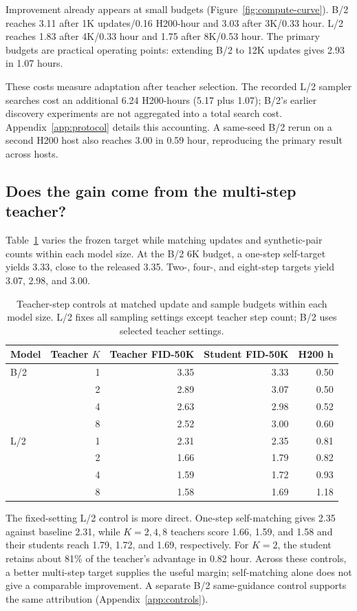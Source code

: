 \documentclass{article}
\begin{document}
Improvement already appears at small budgets (Figure~\ref{fig:compute-curve}).
B/2 reaches 3.11 after 1K updates/0.16 H200-hour and 3.03 after
3K/0.33 hour. L/2 reaches 1.83 after 4K/0.33 hour and 1.75 after
8K/0.53 hour. The primary budgets are practical operating points:
extending B/2 to 12K updates gives 2.93 in 1.07 hours.

These costs measure adaptation after teacher selection. The recorded L/2
sampler searches cost an additional 6.24 H200-hours (5.17 plus 1.07);
B/2's earlier discovery experiments are not aggregated into a total
search cost. Appendix~\ref{app:protocol} details this accounting.
A same-seed B/2 rerun on a second H200 host also reaches 3.00 in
0.59 hour, reproducing the primary result across hosts.

\subsection{Does the gain come from the multi-step teacher?}
Table~\ref{tab:compute-teacher} varies the frozen target while matching
updates and synthetic-pair counts within each model size. At the B/2 6K
budget, a one-step self-target yields 3.33, close to the released 3.35.
Two-, four-, and eight-step targets yield 3.07, 2.98, and 3.00.

\begin{table}[t]
\centering
\caption{Teacher-step controls at matched update and sample budgets within
each model size. L/2 fixes all sampling settings except teacher step count;
B/2 uses selected teacher settings.}
\begin{tabular}{lrrrr}
\toprule
Model & Teacher $K$ & Teacher FID-50K & Student FID-50K & H200 h \\
\midrule
B/2 & 1 & 3.35 & 3.33 & 0.50 \\
& 2 & 2.89 & 3.07 & 0.50 \\
& 4 & 2.63 & 2.98 & 0.52 \\
& 8 & 2.52 & 3.00 & 0.60 \\
\midrule
L/2 & 1 & 2.31 & 2.35 & 0.81 \\
& 2 & 1.66 & 1.79 & 0.82 \\
& 4 & 1.59 & 1.72 & 0.93 \\
& 8 & 1.58 & 1.69 & 1.18 \\
\bottomrule
\end{tabular}
\label{tab:compute-teacher}
\end{table}

The fixed-setting L/2 control is more direct. One-step self-matching gives
2.35 against baseline 2.31, while $K=2,4,8$ teachers score 1.66, 1.59,
and 1.58 and their students reach 1.79, 1.72, and 1.69, respectively.
For $K=2$, the student retains about 81\% of the teacher's advantage in
0.82 hour. Across these controls, a better multi-step target supplies the
useful margin; self-matching alone does not give a comparable improvement.
A separate B/2 same-guidance control supports the same attribution
(Appendix~\ref{app:controls}).
\end{document}
